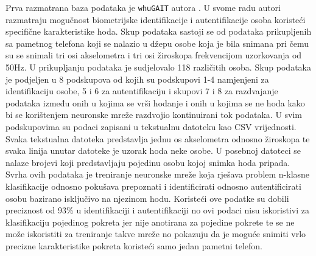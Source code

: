 \documentclass[times, utf8, diplomski]{fer}
\begin{document}
Prva razmatrana baza podataka je \texttt{whuGAIT} autora \cite{zou2020gait}. U svome radu autori razmatraju mogučnost biometrijske
identifikacije i autentifikacije osoba koristeći specifične karakteristike hoda. Skup podataka sastoji se od podataka prikupljenih
sa pametnog telefona koji se nalazio u džepu osobe koja je bila snimana pri čemu su se snimali tri osi akselometra i tri osi
žiroskopa frekvencijom uzorkovanja od 50Hz. U prikupljanju podataka je sudjelovalo 118 različitih osoba. Skup podataka je podjeljen
u 8 podskupova od kojih su podskupovi 1-4 namjenjeni za identifikaciju osobe, 5 i 6 za autentifikaciju i skupovi 7 i 8 za
razdvajanje podataka između onih u kojima se vrši hodanje i onih u kojima se ne hoda kako bi se korištenjem neuronske mreže
razdvojio kontinuirani tok podataka. U svim podskupovima su podaci zapisani u tekstualnu datoteku kao CSV vrijednosti. Svaka
tekstualna datoteka predstavlja jednu os akselometra odnosno žiroskopa te svaka linija unutar datoteke je uzorak hoda neke osobe.
U posebnoj datoteci se nalaze brojevi koji predstavljaju pojedinu osobu kojoj snimka hoda pripada. Svrha ovih podataka je treniranje
neuronske mreže koja rješava problem n-klasne klasifikacije odnosno pokušava prepoznati i identificirati odnosno autentificirati
osobu bazirano isključivo na njezinom hodu. Koristeći ove podatke \cite{zou2020gait} su dobili preciznost od 93\% u identifikaciji 
i autentifikaciji no ovi podaci nisu iskoristivi za klasifikaciju pojedinog pokreta jer nije anotirana za pojedine pokrete te se 
ne može iskoristiti za treniranje takve mreže no pokazuju da je moguće snimiti vrlo precizne karakteristike pokreta koristeći samo 
jedan pametni telefon.
\end{document}
